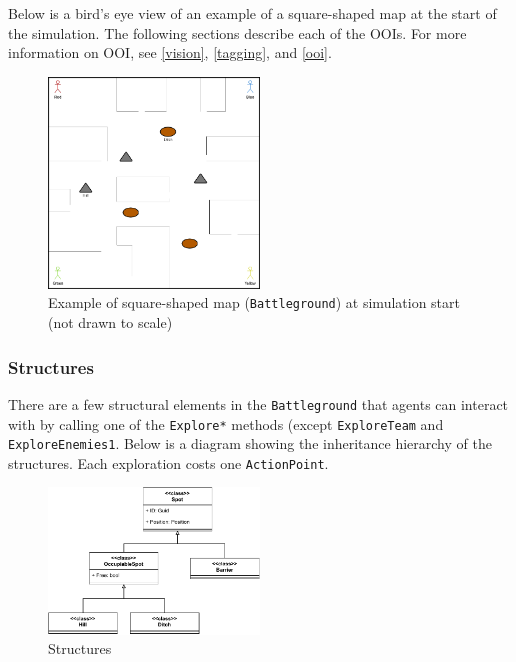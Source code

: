 \documentclass[
    a4paper,
    english,
    DIV=16,
    11pt,
    parskip=half,
    listof=totoc,		%
    index=totoc,		%
    bibliography=totoc,	%
]{scrartcl}
\begin{document}
Below is a bird's eye view of an example of a square-shaped map at the start of the simulation. The following sections describe each of the OOIs. For more information on OOI, see \ref{vision}, \ref{tagging}, and \ref{ooi}.

\begin{figure}[H]
    \centering
    \includegraphics[width=0.5\textwidth, height=0.5\textheight,keepaspectratio]{img/ExampleGameWorldAtSimStart.png}
    \caption{Example of square-shaped map (\texttt{Battleground}) at simulation start (not drawn to scale)}
    \label{battleEx}
\end{figure}

\subsubsection{Structures}
There are a few structural elements in the \texttt{Battleground} that agents can interact with by calling one of the \texttt{Explore*} methods (except \texttt{ExploreTeam} and \texttt{ExploreEnemies1}. Below is a diagram showing the inheritance hierarchy of the structures. Each exploration costs one \texttt{ActionPoint}.

\begin{figure}[H]
    \centering
    \includegraphics[width=0.5\textwidth, height=0.5\textheight,keepaspectratio]{img/lasertag-env-comps.pdf}
    \caption{Structures}
    \label{structures}
\end{figure}
\end{document}
